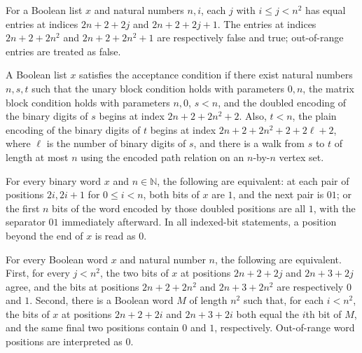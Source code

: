 \begin{definition}
\label{Complexity.MatRest}
\leanok
For a Boolean list $x$ and natural numbers $n,i$, each $j$ with $i\le j<n^2$ has equal
entries at indices $2n+2+2j$ and $2n+2+2j+1$. The entries at indices $2n+2+2n^2$ and
$2n+2+2n^2+1$ are respectively false and true; out-of-range entries are treated as
false.
\end{definition}

\begin{definition}
\label{Complexity.PathAcc}
\leanok
{}
A Boolean list $x$ satisfies the acceptance condition if there exist natural numbers
$n,s,t$ such that the unary block condition holds with parameters $0,n$, the matrix
block condition holds with parameters $n,0$, $s<n$, and the doubled encoding of the
binary digits of $s$ begins at index $2n+2+2n^2+2$. Also, $t<n$, the plain encoding of
the binary digits of $t$ begins at index $2n+2+2n^2+2+2\ell+2$, where $\ell$ is the
number of binary digits of $s$, and there is a walk from $s$ to $t$ of length at most
$n$ using the encoded path relation on an $n$-by-$n$ vertex set.
\end{definition}

\begin{lemma}
\label{Complexity.unaryRest_iff}
\leanok
{}
For every binary word $x$ and $n\in\mathbb N$, the following are equivalent: at each
pair of positions $2i,2i+1$ for $0\le i<n$, both bits of $x$ are $1$, and the next pair
is $01$; or the first $n$ bits of the word encoded by those doubled positions are all
$1$, with the separator $01$ immediately afterward. In all indexed-bit statements, a
position beyond the end of $x$ is read as $0$.
\end{lemma}

\begin{lemma}
\label{Complexity.matRest_iff}
\leanok
{}
For every Boolean word $x$ and natural number $n$, the following are equivalent. First,
for every $j<n^2$, the two bits of $x$ at positions $2n+2+2j$ and $2n+3+2j$ agree, and
the bits at positions $2n+2+2n^2$ and $2n+3+2n^2$ are respectively $0$ and $1$. Second,
there is a Boolean word $M$ of length $n^2$ such that, for each $i<n^2$, the bits of $x$
at positions $2n+2+2i$ and $2n+3+2i$ both equal the $i$th bit of $M$, and the same final
two positions contain $0$ and $1$, respectively. Out-of-range word positions are
interpreted as $0$.
\end{lemma}

